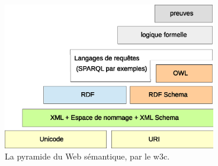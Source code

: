\begin{figure}[h]
    \centering
    \includegraphics[width=0.831\textwidth]{figs/A/semantic-web-stack.eps}
    \caption{La pyramide du Web sémantique, par le
      \acrshort{w3c}\cite{berners2000xml}.}\label{fig:semantic-web-stack}
\end{figure}

